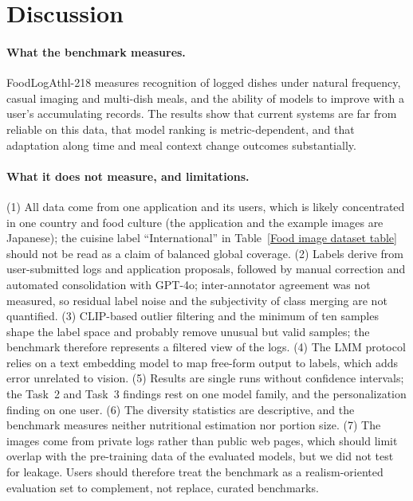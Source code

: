\documentclass[sigconf, nonacm]{acmart}
\begin{document}
\section{Discussion}
\paragraph{What the benchmark measures.} FoodLogAthl-218 measures recognition of logged dishes under natural frequency, casual imaging and multi-dish meals, and the ability of models to improve with a user's accumulating records. The results show that current systems are far from reliable on this data, that model ranking is metric-dependent, and that adaptation along time and meal context change outcomes substantially. 

\paragraph{What it does not measure, and limitations.} (1) All data come from one application and its users, which is likely concentrated in one country and food culture (the application and the example images are Japanese); the cuisine label ``International'' in Table~\ref{Food image dataset table} should not be read as a claim of balanced global coverage. (2) Labels derive from user-submitted logs and application proposals, followed by manual correction and automated consolidation with GPT-4o; inter-annotator agreement was not measured, so residual label noise and the subjectivity of class merging are not quantified. (3) CLIP-based outlier filtering and the minimum of ten samples shape the label space and probably remove unusual but valid samples; the benchmark therefore represents a filtered view of the logs. (4) The LMM protocol relies on a text embedding model to map free-form output to labels, which adds error unrelated to vision. (5) Results are single runs without confidence intervals; the Task~2 and Task~3 findings rest on one model family, and the personalization finding on one user. (6) The diversity statistics are descriptive, and the benchmark measures neither nutritional estimation nor portion size. (7) The images come from private logs rather than public web pages, which should limit overlap with the pre-training data of the evaluated models, but we did not test for leakage. Users should therefore treat the benchmark as a realism-oriented evaluation set to complement, not replace, curated benchmarks.
\end{document}
